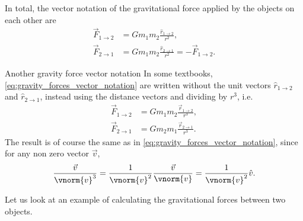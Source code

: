 In total, the vector notation of the gravitational force applied by the objects on each other are
\begin{align}
  \vec{F}_{1\to2} &= Gm_{1}m_{2}\frac{\hat{r}_{1\to2}}{r^{2}}\nonumber,\\
  \vec{F}_{2\to1} &= Gm_{1}m_{2}\frac{\hat{r}_{2\to1}}{r^{2}} = -\vec{F}_{1\to2}.
  \label{eq:gravity_forces_vector_notation}
\end{align}

\begin{note}{Another gravity force vector notation}{}
  In some textbooks, \autoref{eq:gravity_forces_vector_notation} are written without the unit vectors $\hat{r}_{1\to2}$ and $\hat{r}_{2\to1}$, instead using the distance vectors and dividing by $r^{3}$, i.e.
  \begin{align*}
    \vec{F}_{1\to2} &= Gm_{1}m_{2}\frac{\vec{r}_{1\to2}}{r^{3}},\\
    \vec{F}_{2\to1} &= Gm_{2}m_{1}\frac{\vec{r}_{2\to1}}{r^{3}}.
  \end{align*}
  The result is of course the same as in \autoref{eq:gravity_forces_vector_notation}, since for any non zero vector $\vec{v}$,
  \begin{align*}
    \frac{\vec{v}}{\vnorm{v}^{3}} = \frac{1}{\vnorm{v}^{2}}\frac{\vec{v}}{\vnorm{v}} = \frac{1}{\vnorm{v}^{2}}\hat{v}.
  \end{align*}
\end{note}

Let us look at an example of calculating the gravitational forces between two objects.

